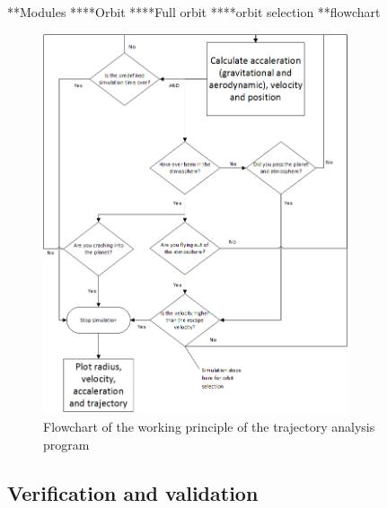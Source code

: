 **Modules
****Orbit
****Full orbit
****orbit selection
**flowchart
\begin{figure}[H]
\hspace{-23mm}
\includegraphics[width = 0.8\textwidth]{Figure/astro_tool.png}
\vspace{-5mm}
\caption{Flowchart of the working principle of the trajectory analysis program}
\label{fig:traj_flow}
\end{figure}

\subsection{Verification and validation}